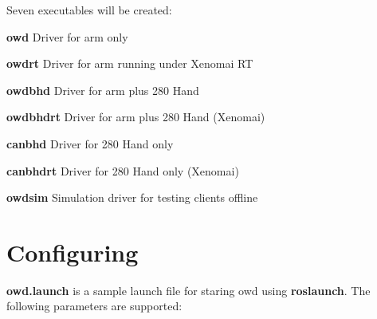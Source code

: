 Seven executables will be created\-:
\begin{DoxyItemize}
\item {\bfseries owd} Driver for arm only
\item {\bfseries owdrt} Driver for arm running under Xenomai R\-T
\item {\bfseries owdbhd} Driver for arm plus 280 Hand
\item {\bfseries owdbhdrt} Driver for arm plus 280 Hand (Xenomai)
\item {\bfseries canbhd} Driver for 280 Hand only
\item {\bfseries canbhdrt} Driver for 280 Hand only (Xenomai)
\item {\bfseries owdsim} Simulation driver for testing clients offline
\end{DoxyItemize}\hypertarget{index_configuration}{}\section{Configuring}\label{index_configuration}
{\bfseries owd.\-launch} is a sample launch file for staring owd using {\bfseries roslaunch}. The following parameters are supported\-:


